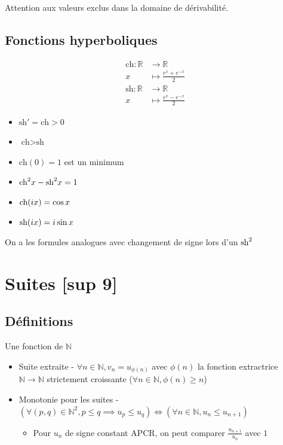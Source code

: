 \documentclass[openany]{book}
\begin{document}
\noindent Attention aux valeurs exclus dans la domaine de dérivabilité. \\

\subsection{Fonctions hyperboliques}
\begin{align*}
    \text{ch} : \mathbb{R} &\to \mathbb{R} \\
    x &\mapsto \frac{e^x+e^{-x}}{2} \\
    \text{sh} : \mathbb{R} &\to \mathbb{R} \\
    x &\mapsto \frac{e^x-e^{-x}}{2}
\end{align*}

\begin{itemize}
    \item $ \text{sh}' = \text{ch} > 0 $
    \item $ \text{ch} > \text{sh} $
    \item $ \text{ch}(0) = 1 $ est un minimum
    \item $\text{ch}^2x - \text{sh}^2x = 1$
    \item $\text{ch} (ix) = \cos{x}$
    \item $\text{sh}(ix) = i\sin{x}$
\end{itemize}
\noindent On a les formules analogues avec changement de signe lors d'un $\text{sh}^2$

\clearpage
\section{Suites [sup 9]}

\subsection{Définitions}
Une fonction de $\mathbb{N}$

\begin{itemize}
    \item Suite extraite - $ \forall n \in \mathbb{N}, v_n = u_{\phi(n)} $ avec $ \phi(n) $ la fonction extractrice $ \mathbb{N} \rightarrow \mathbb{N} $ strictement croissante ($ \forall n \in \mathbb{N}, \phi(n) \geq n $)
    \item Monotonie pour les suites - $ (\forall(p, q) \in \mathbb{N}^2, p \leq q \implies u_p \leq u_q) \iff (\forall n \in \mathbb{N}, u_n \leq u_{n+1}) $
    \begin{itemize}
        \item Pour $u_n$ de signe constant APCR, on peut comparer $\frac{u_{n+1}}{u_n}$ avec $1$
    \end{itemize}
\end{itemize}
\end{document}

